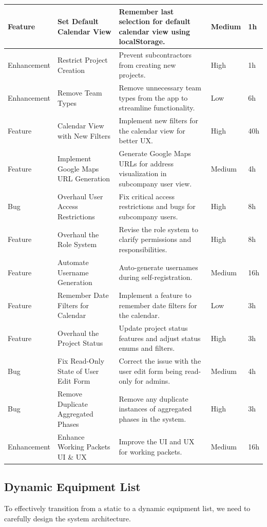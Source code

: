 \begin{longtable}{ | m{} | m{} | m{} | m{} | m{} | }
    \hline
    Feature & Set Default Calendar View & Remember last selection for default calendar view using localStorage. & Medium & 1h \\
    \hline
    Enhancement & Restrict Project Creation & Prevent subcontractors from creating new projects. & High & 1h \\
    \hline
    Enhancement & Remove Team Types & Remove unnecessary team types from the app to streamline functionality. & Low & 6h \\
    \hline
    Feature & Calendar View with New Filters & Implement new filters for the calendar view for better UX. & High & 40h \\
    \hline
    Feature & Implement Google Maps URL Generation & Generate Google Maps URLs for address visualization in subcompany user view. & Medium & 4h \\
    \hline
    Bug & Overhaul User Access Restrictions & Fix critical access restrictions and bugs for subcompany users. & High & 8h \\
    \hline
    \rowcolor{blue!20} 
    Feature & Overhaul the Role System & Revise the role system to clarify permissions and responsibilities. & High & 8h \\
    \hline
    Feature & Automate Username Generation & Auto-generate usernames during self-registration. & Medium & 16h \\
    \hline
    Feature & Remember Date Filters for Calendar & Implement a feature to remember date filters for the calendar. & Low & 3h \\
    \hline
    Feature & Overhaul the Project Status & Update project status features and adjust status enums and filters. & High & 3h \\
    \hline
    Bug & Fix Read-Only State of User Edit Form & Correct the issue with the user edit form being read-only for admins. & Medium & 4h \\
    \hline
    Bug & Remove Duplicate Aggregated Phases & Remove any duplicate instances of aggregated phases in the system. & High & 3h \\
    \hline
    \rowcolor{blue!20} Enhancement & Enhance Working Packets UI \& UX & Improve the UI and UX for working packets. & Medium & 16h \\
    \hline
\end{longtable}

\subsection{Dynamic Equipment List}
To effectively transition from a static to a dynamic equipment list, we need to carefully design the system architecture.

